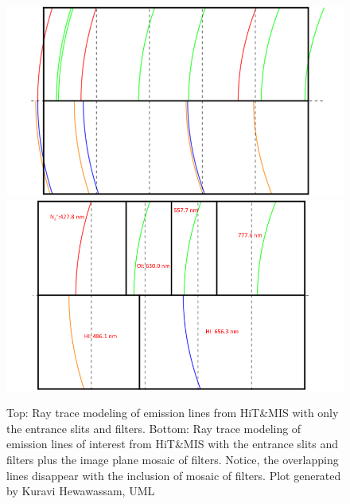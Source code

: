 \documentclass[crop=false,class=mitthesis,oneside,font=12pt]{standalone}
\begin{document}
\begin{figure}[H]
	\centering\includegraphics[width=30pc]{hit_i.png}
    \centering\includegraphics[width=30pc]{hit_f.png}
	\caption{Top: Ray trace modeling of emission lines from HiT\&MIS with only the entrance slits and filters. Bottom: Ray trace modeling of emission lines of interest from HiT\&MIS with the entrance slits and filters plus the image plane mosaic of filters. Notice, the overlapping lines disappear with the inclusion of mosaic of filters. Plot generated by Kuravi Hewawassam, UML}
	\label{fig:hit_if}
\end{figure}
\end{document}

